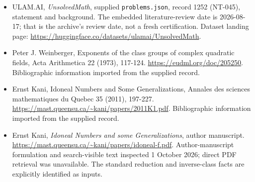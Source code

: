 \documentclass[11pt,a4paper]{article}
\begin{document}
{\small

\begin{itemize}

\item[\hypertarget{source:1252:1}{S1}] ULAM.AI, \emph{UnsolvedMath}, supplied \texttt{problems.json}, record 1252 (NT-045), statement and background. The embedded literature-review date is 2026-08-17; that is the archive’s review date, not a fresh certification. Dataset landing page: \url{https://huggingface.co/datasets/ulamai/UnsolvedMath}.

\item[\hypertarget{source:1252:2}{S2}] Peter J. Weinberger, Exponents of the class groups of complex quadratic fields, Acta Arithmetica 22 (1973), 117-124. \url{https://eudml.org/doc/205250}. Bibliographic information imported from the supplied record.

\item[\hypertarget{source:1252:3}{S3}] Ernst Kani, Idoneal Numbers and Some Generalizations, Annales des sciences mathematiques du Quebec 35 (2011), 197-227. \url{https://mast.queensu.ca/~kani/papers/2011K1.pdf}. Bibliographic information imported from the supplied record.


\item[E1] Ernst Kani, \emph{Idoneal Numbers and some Generalizations},
author manuscript. \url{https://mast.queensu.ca/~kani/papers/idoneal-f.pdf}.
Author-manuscript formulation and search-visible text inspected
1 October 2026; direct PDF retrieval was unavailable. The standard
reduction and inverse-class facts are explicitly identified as inputs.

\end{itemize}

}

\label{end:1252}
\end{document}
